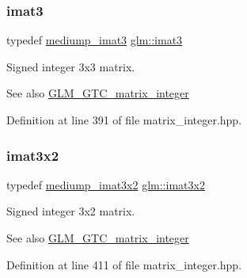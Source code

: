 \mbox{\label{group__gtc__matrix__integer_ga45481922dd07a3a8e23758286311ee97}} 
\subsubsection{\texorpdfstring{imat3}{imat3}}
{\footnotesize\ttfamily typedef \hyperlink{group__gtc__matrix__integer_ga6b438ab863af0122b532adc93b89105e}{mediump\+\_\+imat3} \hyperlink{group__gtc__matrix__integer_ga45481922dd07a3a8e23758286311ee97}{glm\+::imat3}}

Signed integer 3x3 matrix. \begin{DoxySeeAlso}{See also}
\hyperlink{group__gtc__matrix__integer}{G\+L\+M\+\_\+\+G\+T\+C\+\_\+matrix\+\_\+integer} 
\end{DoxySeeAlso}


Definition at line 391 of file matrix\+\_\+integer.\+hpp.

\mbox{\label{group__gtc__matrix__integer_ga04deef94cdfdd3b3b2706e10a32ef7f3}} 
\subsubsection{\texorpdfstring{imat3x2}{imat3x2}}
{\footnotesize\ttfamily typedef \hyperlink{group__gtc__matrix__integer_ga2a90775c74656b8a825f24d510f0ea5d}{mediump\+\_\+imat3x2} \hyperlink{group__gtc__matrix__integer_ga04deef94cdfdd3b3b2706e10a32ef7f3}{glm\+::imat3x2}}

Signed integer 3x2 matrix. \begin{DoxySeeAlso}{See also}
\hyperlink{group__gtc__matrix__integer}{G\+L\+M\+\_\+\+G\+T\+C\+\_\+matrix\+\_\+integer} 
\end{DoxySeeAlso}


Definition at line 411 of file matrix\+\_\+integer.\+hpp.

\mbox{\label{group__gtc__matrix__integer_gaeff9ef8f56cccc828d6b897923e75402}} 

